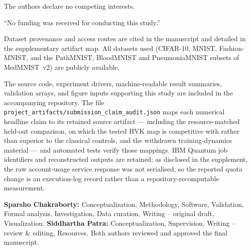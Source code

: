 \documentclass[pdflatex,sn-basic]{sn-jnl}
\begin{document}
\begin{description}\itemsep4pt
  \item[Competing interests.] The authors declare no competing interests.

  \item[Funding.]``No funding was received for conducting this study.''

  \item[Data availability.] Dataset provenance and access routes are cited in the
        manuscript and detailed in the supplementary artifact map. All datasets
        used (CIFAR-10, MNIST, Fashion-MNIST, and the PathMNIST, BloodMNIST and
        PneumoniaMNIST subsets of MedMNIST~v2) are publicly available.

  \item[Code availability.] The source code, experiment drivers,
        machine-readable result summaries, validation arrays, and figure inputs
        supporting this study are included in the accompanying repository. The
        file \texttt{project\_artifacts/submission\_claim\_audit.json} maps each
        numerical headline claim to its retained source artifact --- including
        the resource-matched held-out comparison, on which the tested HVK map is
        competitive with rather than superior to the classical controls, and the
        withdrawn training-dynamics material --- and automated tests verify those
        mappings.
        IBM Quantum job identifiers and reconstructed outputs are retained; as
        disclosed in the supplement, the raw account-usage service response was
        not serialised, so the reported quota change is an execution-log record
        rather than a repository-recomputable measurement.

  \item[Author contributions.] \textbf{Sparsho Chakraborty:}
        Conceptualization, Methodology, Software, Validation, Formal analysis,
        Investigation, Data curation, Writing -- original draft, Visualization.
        \textbf{Siddhartha Patra:} Conceptualization, Supervision, Writing --
        review \& editing, Resources. Both authors reviewed and approved the
        final manuscript.
\end{description}

% 

\end{document}
